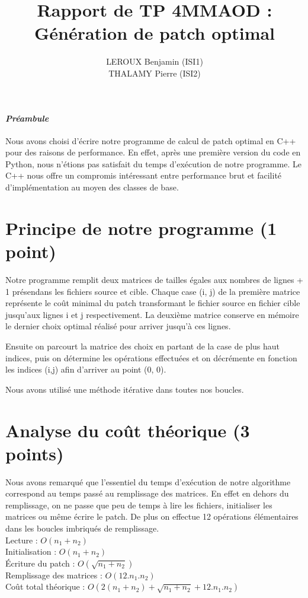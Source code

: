 \documentclass[a4paper, 10pt, french]{article}
\title{Rapport de TP 4MMAOD : Génération de patch optimal}
\author{
    LEROUX Benjamin (ISI1)
\\  THALAMY Pierre (ISI2)
}
\begin{document}
\maketitle

\paragraph{\em Préambule}
    Nous avons choisi d'écrire notre programme de calcul de patch optimal en C++ pour des raisons de performance. En effet, après une première version du code en Python, nous n'étions pas satisfait du temps d'exécution de notre programme. Le C++ nous offre un compromis intéressant entre performance brut et facilité d'implémentation au moyen des classes de base.

\section{Principe de notre  programme (1 point)}

Notre programme remplit deux matrices de tailles égales aux nombres de lignes + 1 présendans les fichiers source et cible. Chaque case (i, j) de la première matrice représente le coût minimal du patch transformant le fichier source en fichier cible jusqu'aux lignes i et j respectivement. La deuxième matrice conserve en mémoire le dernier choix optimal réalisé pour arriver jusqu'à ces lignes.

Ensuite on parcourt la matrice des choix en partant de la case de plus haut indices, puis on détermine les opérations effectuées et on décrémente en fonction les indices (i,j) afin d'arriver au point (0, 0).

Nous avons utilisé une méthode itérative dans toutes nos boucles.

\section{Analyse du coût théorique (3 points)}
Nous avons remarqué que l'essentiel du temps d'exécution de notre algorithme correspond au temps passé au remplissage des matrices. En effet en dehors du remplissage, on ne passe que peu de temps à lire les fichiers, initialiser les matrices ou même écrire le patch. De plus on effectue 12 opérations élémentaires dans les boucles imbriqués de remplissage.\\
Lecture : $O(n_1+n_2)$\\
Initialisation : $O(n_1+n_2)$\\
Écriture du patch : $O(\sqrt{n_1+n_2})$ \\
Remplissage des matrices : $O(12.n_1.n_2)$\\
Coût total théorique : $O(2(n_1+n_2) + \sqrt{n_1+n_2} + 12.n_1.n_2)$
\end{document}
